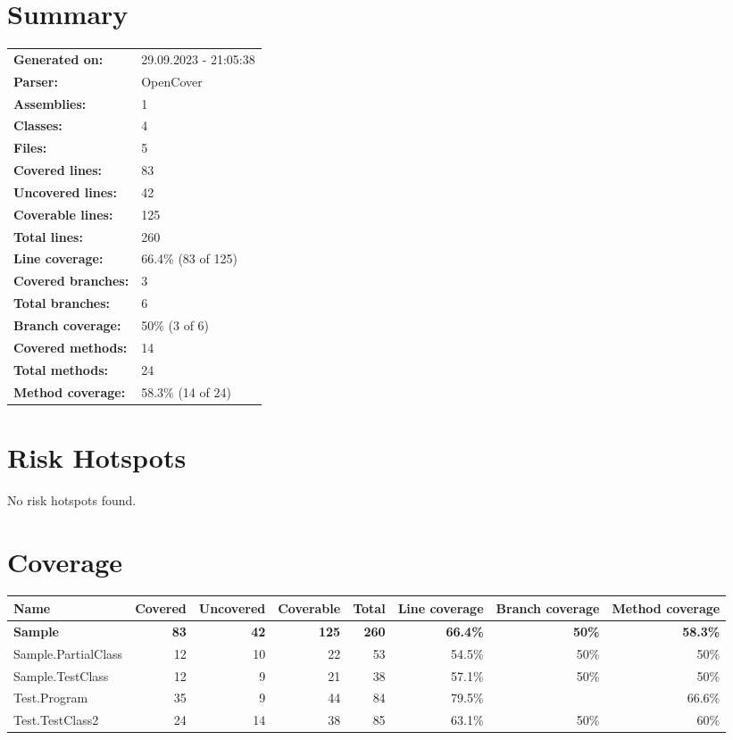 \documentclass[a4paper,landscape,10pt]{article}
\begin{document}
\setcounter{secnumdepth}{-1}
\section{Summary}
\begin{longtable}[l]{ll}
\textbf{Generated on:} & 29.09.2023 - 21:05:38\\
\textbf{Parser:} & OpenCover\\
\textbf{Assemblies:} & 1\\
\textbf{Classes:} & 4\\
\textbf{Files:} & 5\\
\textbf{Covered lines:} & 83\\
\textbf{Uncovered lines:} & 42\\
\textbf{Coverable lines:} & 125\\
\textbf{Total lines:} & 260\\
\textbf{Line coverage:} & 66.4\% (83 of 125)\\
\textbf{Covered branches:} & 3\\
\textbf{Total branches:} & 6\\
\textbf{Branch coverage:} & 50\% (3 of 6)\\
\textbf{Covered methods:} & 14\\
\textbf{Total methods:} & 24\\
\textbf{Method coverage:} & 58.3\% (14 of 24)\\
\end{longtable}
\section{Risk Hotspots}
No risk hotspots found.
\section{Coverage}
\begin{longtable}[l]{|l|r|r|r|r|r|r|r|}
\hline
\textbf{Name} & \textbf{Covered} & \textbf{Uncovered} & \textbf{Coverable} & \textbf{Total} & \textbf{Line coverage} & \textbf{Branch coverage} & \textbf{Method coverage}\\
\hline
\textbf{Sample} & \textbf{83} & \textbf{42} & \textbf{125} & \textbf{260} & \textbf{66.4\%} & \textbf{50\%} & \textbf{58.3\%}\\
\hline
Sample.PartialClass & 12 & 10 & 22 & 53 & 54.5\% & 50\% & 50\%\\
\hline
Sample.TestClass & 12 & 9 & 21 & 38 & 57.1\% & 50\% & 50\%\\
\hline
Test.Program & 35 & 9 & 44 & 84 & 79.5\% &  & 66.6\%\\
\hline
Test.TestClass2 & 24 & 14 & 38 & 85 & 63.1\% & 50\% & 60\%\\
\hline
\end{longtable}
\newpage
\end{document}

